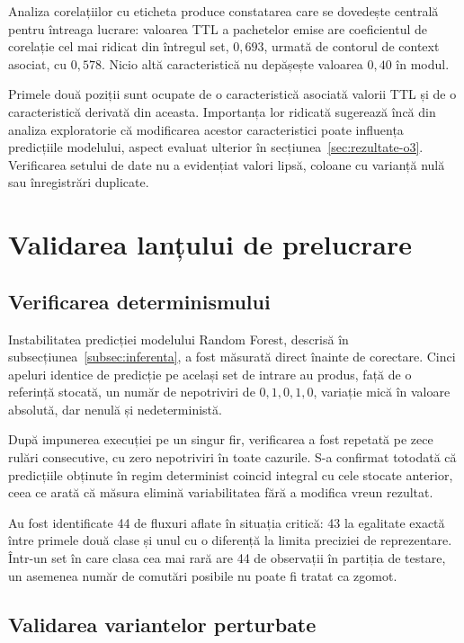 Analiza corelațiilor cu eticheta produce constatarea care se dovedește centrală pentru întreaga lucrare: valoarea TTL a pachetelor emise are coeficientul de corelație cel mai ridicat din întregul set, $0{,}693$, urmată de contorul de context asociat, cu $0{,}578$. Nicio altă caracteristică nu depășește valoarea $0{,}40$ în modul.

Primele două poziții sunt ocupate de o caracteristică asociată valorii TTL și de o caracteristică derivată din aceasta. Importanța lor ridicată sugerează încă din analiza exploratorie că modificarea acestor caracteristici poate influența predicțiile modelului, aspect evaluat ulterior în secțiunea~\ref{sec:rezultate-o3}. Verificarea setului de date nu a evidențiat valori lipsă, coloane cu varianță nulă sau înregistrări duplicate.


\section{Validarea lanțului de prelucrare}\label{sec:validare-lant}

\subsection{Verificarea determinismului}\label{subsec:det}

Instabilitatea predicției modelului Random Forest, descrisă în subsecțiunea~\ref{subsec:inferenta}, a fost măsurată direct înainte de corectare. Cinci apeluri identice de predicție pe același set de intrare au produs, față de o referință stocată, un număr de nepotriviri de $0, 1, 0, 1, 0$, variație mică în valoare absolută, dar nenulă și nedeterministă.

După impunerea execuției pe un singur fir, verificarea a fost repetată pe zece rulări consecutive, cu zero nepotriviri în toate cazurile. S-a confirmat totodată că predicțiile obținute în regim determinist coincid integral cu cele stocate anterior, ceea ce arată că măsura elimină variabilitatea fără a modifica vreun rezultat.

Au fost identificate 44 de fluxuri aflate în situația critică: 43 la egalitate exactă între primele două clase și unul cu o diferență la limita preciziei de reprezentare. Într-un set în care clasa cea mai rară are 44 de observații în partiția de testare, un asemenea număr de comutări posibile nu poate fi tratat ca zgomot.

\subsection{Validarea variantelor perturbate}\label{subsec:valvar}

